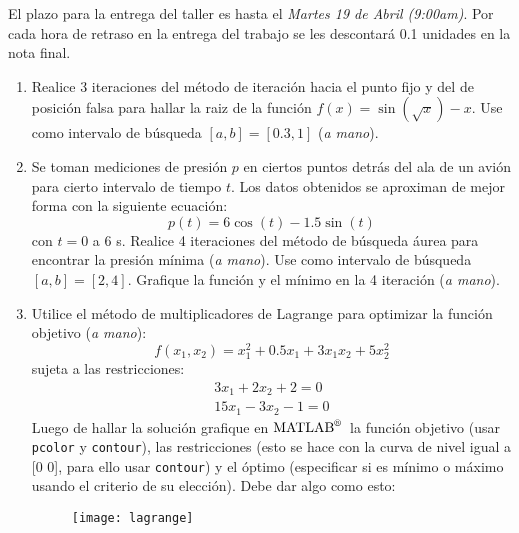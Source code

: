 \documentclass[letterpaper,12pt]{exam}
\newcommand{\matlab}{$\text{MATLAB}^{\text{\textregistered}}$~}
\begin{document}
\begin{center}
\end{center}

\vspace{1cm}
\noindent El plazo para la entrega del taller es hasta el \emph{Martes 19 de Abril (9:00am)}. Por cada hora de retraso en la entrega del trabajo se les descontará 0.1 unidades en la nota final. 

\begin{enumerate}
 \item Realice 3 iteraciones del método de iteración hacia el punto fijo y del de posición falsa para hallar la raiz de la función $f(x)= \sin(\sqrt{x})-x$. Use como intervalo de búsqueda $[a,b]=[0.3,1]$ (\emph{a mano}).

 \item Se toman mediciones de presión $p$ en ciertos puntos detrás del ala de un avión para cierto intervalo de tiempo $t$. Los datos obtenidos se aproximan de mejor forma con la siguiente ecuación:
 \begin{equation}
  p(t) = 6 \cos(t) − 1.5 \sin(t)
 \end{equation}
 con $t = 0$ a $6$ s. Realice 4 iteraciones del método de búsqueda áurea para encontrar la presión mínima (\emph{a mano}). Use como intervalo de búsqueda $[a,b]=[2,4]$. Grafique la función y el mínimo en la 4 iteración (\emph{a mano}).

 \item Utilice el método de multiplicadores de Lagrange para optimizar la función objetivo (\emph{a mano}):
 \begin{equation}
  f(x_1,x_2) = x_1^2 + 0.5x_1 + 3x_1x_2 + 5x_2^2
 \end{equation}
 sujeta a las restricciones:
 \begin{align}
  3x_1 + 2x_2 + 2  = 0 \\
  15x_1 − 3x_2 − 1 = 0
 \end{align}
 Luego de hallar la solución grafique en \matlab la función objetivo (usar \texttt{pcolor} y \texttt{contour}), las restricciones (esto se hace con la curva de nivel igual a [0 0], para ello usar \texttt{contour}) y el óptimo (especificar si es mínimo o máximo usando el criterio de su elección). Debe dar algo como esto:
 \begin{figure}[h!]
  \centering
  \texttt{[image: lagrange]}
 \end{figure} 
 

\end{enumerate}
\end{document}
